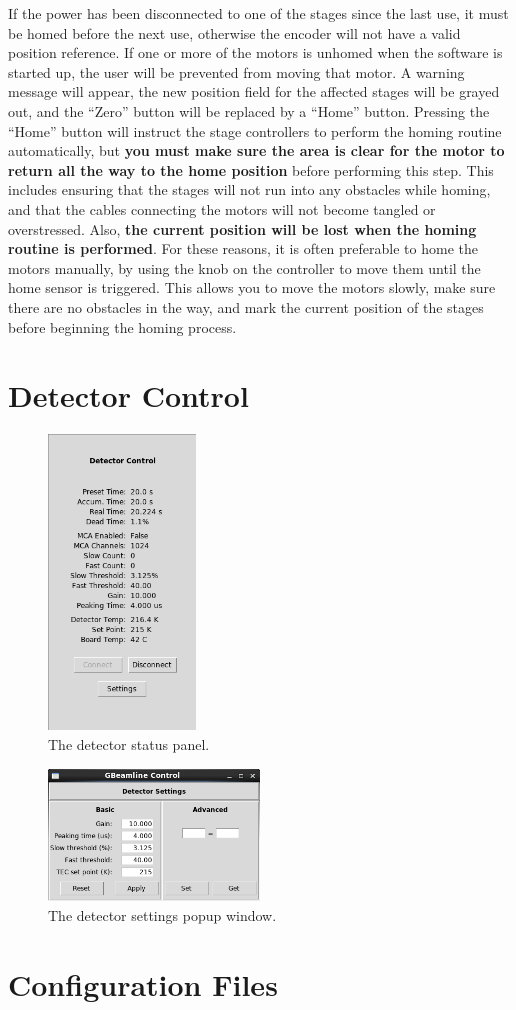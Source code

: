 If the power has been disconnected to one of the stages since the last use, it must be homed before the next use, otherwise the encoder will not have a valid position reference. If one or more of the motors is unhomed when the software is started up, the user will be prevented from moving that motor. A warning message will appear, the new position field for the affected stages will be grayed out, and the ``Zero'' button will be replaced by a ``Home'' button. Pressing the ``Home'' button will instruct the stage controllers to perform the homing routine automatically, but \textbf{you must make sure the area is clear for the motor to return all the way to the home position} before performing this step. This includes ensuring that the stages will not run into any obstacles while homing, and that the cables connecting the motors will not become tangled or overstressed. Also, \textbf{the current position will be lost when the homing routine is performed}. For these reasons, it is often preferable to home the motors manually, by using the knob on the controller to move them until the home sensor is triggered. This allows you to move the motors slowly, make sure there are no obstacles in the way, and mark the current position of the stages before beginning the homing process.


\section{Detector Control}

\begin{figure}
\centering
\includegraphics[width=0.35\textwidth]{detctl.png}
\caption{\label{fig:detctl} The detector status panel.}
\end{figure}

\begin{figure}
\centering
\includegraphics[width=0.5\textwidth]{detsettings.png}
\caption{\label{fig:detsettings} The detector settings popup window.}
\end{figure}

\section{Configuration Files}
